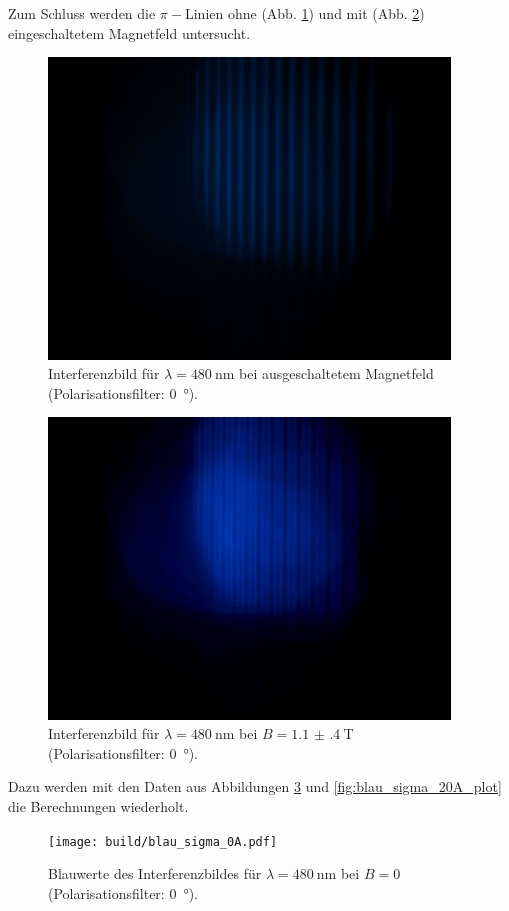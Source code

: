 Zum Schluss werden die $\pi-$Linien ohne (Abb. \ref{fig:blau_sigma_0A}) und mit (Abb. \ref{fig:blau_sigma_20A}) eingeschaltetem Magnetfeld untersucht.
\begin{figure}[htb]
  \centering
  \includegraphics[height=8cm]{content/pictures/blau_sigma_0A.JPG}
  \caption{Interferenzbild für $\lambda=\SI{480}{\nano\meter}$ bei ausgeschaltetem Magnetfeld (Polarisationsfilter: \SI{0}{\degree}).}
  \label{fig:blau_sigma_0A}
\end{figure}
\begin{figure}[htb]
  \centering
  \includegraphics[height=8cm]{content/pictures/blau_sigma_20A.JPG}
  \caption{Interferenzbild für $\lambda=\SI{480}{\nano\meter}$ bei $B=\SI{1.1(4)}{\tesla}$ (Polarisationsfilter: \SI{0}{\degree}).}
  \label{fig:blau_sigma_20A}
\end{figure}
Dazu werden mit den Daten aus Abbildungen \ref{fig:blau_sigma_0A_plot} und \ref{fig:blau_sigma_20A_plot} die Berechnungen wiederholt.
\begin{figure}[htb]
  \centering
  \texttt{[image: build/blau\_sigma\_0A.pdf]}
  \caption{Blauwerte des Interferenzbildes für $\lambda=\SI{480}{\nano\meter}$ bei $B=0$ (Polarisationsfilter: \SI{0}{\degree}).}
  \label{fig:blau_sigma_0A_plot}
\end{figure}
